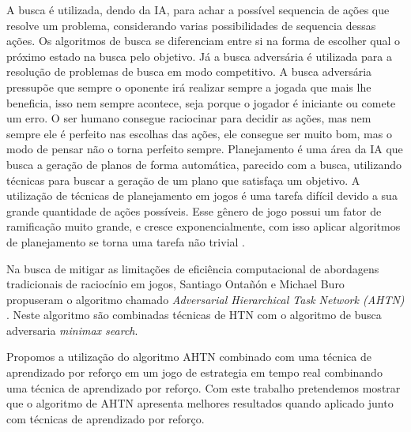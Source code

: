 A busca é utilizada, dendo da IA, para achar a possível sequencia de ações que resolve um problema, considerando varias possibilidades de sequencia dessas ações. Os algoritmos de busca se diferenciam entre si na forma de escolher qual o próximo estado na busca pelo objetivo. Já a busca adversária é utilizada para a resolução de problemas de busca em modo competitivo. A busca adversária pressupõe que sempre o oponente irá realizar sempre a jogada que mais lhe beneficia, isso nem sempre acontece, seja porque o jogador é iniciante ou comete um erro. O ser humano consegue raciocinar para decidir as ações, mas nem sempre ele é perfeito nas escolhas das ações, ele consegue ser muito bom, mas o modo de pensar não o torna perfeito sempre. Planejamento é uma área da IA que busca a geração de planos de forma automática, parecido com a busca, utilizando técnicas para buscar a geração de um plano que satisfaça um objetivo. A utilização de técnicas de planejamento em jogos é uma tarefa difícil devido a sua grande quantidade de ações possíveis. Esse gênero de jogo possui um fator de ramificação muito grande, e cresce exponencialmente, com isso aplicar algoritmos de planejamento se torna uma tarefa não trivial \cite{intelligence2003modern}. 


Na busca de mitigar as limitações de eficiência computacional de abordagens tradicionais de raciocínio em jogos, Santiago Ontañón e Michael Buro propuseram o algoritmo chamado \textit{Adversarial Hierarchical Task Network (AHTN)} \cite{ontanon2015adversarial}. Neste algoritmo são combinadas técnicas de HTN com o algoritmo de busca adversaria \textit{minimax search}. 

Propomos a utilização do algoritmo AHTN combinado com uma técnica de aprendizado por reforço em um jogo de estrategia em tempo real combinando uma técnica de aprendizado por reforço. Com este trabalho pretendemos mostrar que o algoritmo de AHTN apresenta melhores resultados quando aplicado junto com técnicas de aprendizado por reforço.




